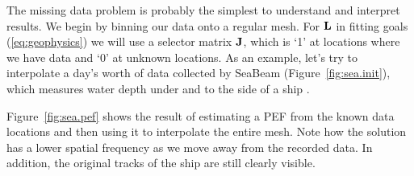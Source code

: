 The missing data problem is probably the simplest to understand and
interpret results.  
We  begin by binning our data onto a regular mesh.
For $\bf L$ in fitting goals (\ref{eq:geophysics}) we will use a selector 
matrix $\bf J$,
which is `1' at locations where we have data and `0' at unknown locations.
As an  example, let's  try to interpolate 
a day's worth of  data
collected by SeaBeam (Figure~\ref{fig:sea.init}), which measures
water depth under and to the side of a  ship \cite{gee}. 


Figure~\ref{fig:sea.pef} shows the result of estimating a PEF from the
known data locations and then using it to interpolate the entire mesh.
Note how the solution has a lower spatial frequency as we move away from
the recorded data. In addition, the original tracks of the ship are still
clearly visible.  


